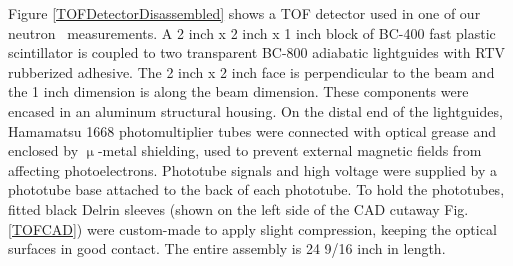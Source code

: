 Figure \ref{TOFDetectorDisassembled} shows a TOF detector used in one
of our neutron \tot\ measurements. A 2 inch x 2 inch x 1 inch block of BC-400 fast
plastic scintillator is coupled to two transparent
BC-800 adiabatic lightguides with RTV rubberized adhesive. The 2 inch x 2 inch face is perpendicular
to the beam and the 1 inch dimension is along the beam dimension. These components were encased
in an aluminum structural housing. On the distal end of the lightguides, Hamamatsu 1668
photomultiplier tubes were connected with optical grease and enclosed by
$\upmu$-metal shielding, used to prevent external magnetic fields from affecting photoelectrons.
Phototube signals and high voltage were supplied by a phototube base attached to the back of each
phototube. To hold the phototubes, fitted black Delrin sleeves (shown on the
left side of the CAD cutaway Fig. \ref{TOFCAD}) were custom-made to apply slight
compression, keeping the optical surfaces in good contact. The entire assembly
is 24 9/16 inch in length.

